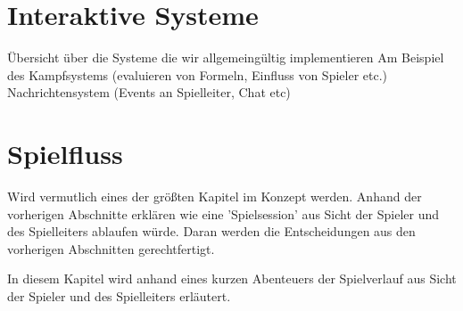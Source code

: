 \section{Interaktive Systeme}
\label{sec:InteraktiveSysteme}
Übersicht über die Systeme die wir allgemeingültig implementieren\newline
Am Beispiel des Kampfsystems (evaluieren von Formeln, Einfluss von Spieler etc.)\newline
Nachrichtensystem (Events an Spielleiter, Chat etc)\newline


\section{Spielfluss}
\label{sec:Spielfluss}
Wird vermutlich eines der größten Kapitel im Konzept werden. Anhand der vorherigen Abschnitte erklären wie eine 'Spielsession' aus Sicht der Spieler und des Spielleiters ablaufen würde. Daran werden die Entscheidungen aus den vorherigen Abschnitten gerechtfertigt.\newline
{}


In diesem Kapitel wird anhand eines kurzen Abenteuers der Spielverlauf aus Sicht der Spieler und des Spielleiters erläutert.